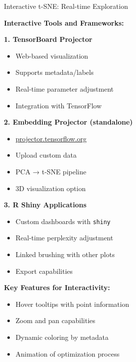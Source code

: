 \documentclass[10pt]{beamer}
\begin{document}
\begin{frame}{Interactive t-SNE: Real-time Exploration}

\textbf{Interactive Tools and Frameworks:}

\vspace{0.2cm}
\textbf{1. TensorBoard Projector}
\begin{itemize}
    \setlength\itemsep{0em}
    \item Web-based visualization
    \item Supports metadata/labels
    \item Real-time parameter adjustment
    \item Integration with TensorFlow
\end{itemize}

\vspace{0.15cm}
\textbf{2. Embedding Projector (standalone)}
\begin{itemize}
    \setlength\itemsep{0em}
    \item \url{projector.tensorflow.org}
    \item Upload custom data
    \item PCA → t-SNE pipeline
    \item 3D visualization option
\end{itemize}

\vspace{0.15cm}
\textbf{3. R Shiny Applications}
\begin{itemize}
    \setlength\itemsep{0em}
    \item Custom dashboards with \texttt{shiny}
    \item Real-time perplexity adjustment
    \item Linked brushing with other plots
    \item Export capabilities
\end{itemize}

\vspace{0.15cm}
\textbf{Key Features for Interactivity:}
\begin{itemize}
    \setlength\itemsep{0em}
    \item Hover tooltips with point information
    \item Zoom and pan capabilities
    \item Dynamic coloring by metadata
    \item Animation of optimization process
\end{itemize}

\end{frame}
\end{document}
